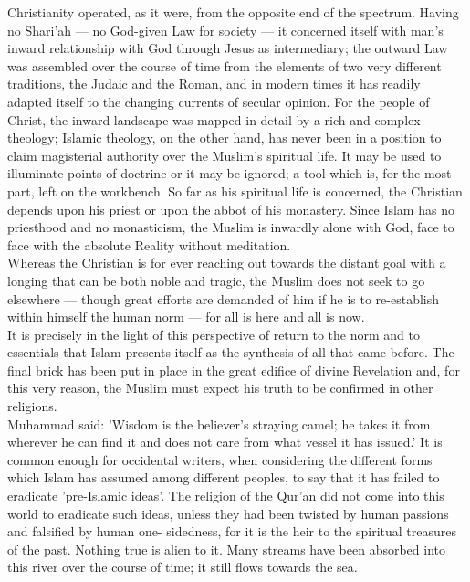 \documentclass[10pt, twoside]{book}
\begin{document}
Christianity operated, as it were, from the opposite end of the spectrum. Having no Shari'ah --- no 
God-given Law for society --- it concerned itself with man's inward relationship with God through Jesus 
as intermediary; the outward Law was assembled over the course of time from the elements of two very 
different traditions, the Judaic and the Roman, and in modern times it has readily adapted itself to 
the changing currents of secular opinion. For the people of Christ, the inward landscape was mapped 
in detail by a rich and complex theology; Islamic theology, on the other hand, has never been in a 
position to claim magisterial authority over the Muslim's spiritual life. It may be used to 
illuminate points of doctrine or it may be ignored; a tool which is, for the most part, left on the 
workbench. So far as his spiritual life is concerned, the Christian depends upon his priest or upon 
the abbot of his monastery. Since Islam has no priesthood and no monasticism, the Muslim is inwardly 
alone with God, face to face with the absolute Reality without meditation. \\

Whereas the Christian is for ever reaching out towards the distant goal with a longing that can be 
both noble and tragic, the Muslim does not seek to go elsewhere --- though great efforts are demanded 
of him if he is to re-establish within himself the human norm --- for all is here and all is now. \\

It is precisely in the light of this perspective of return to the norm and to essentials that Islam 
presents itself as the synthesis of all that came before. The final brick has been put in place in 
the great edifice of divine Revelation and, for this very reason, the Muslim must expect his truth to 
be confirmed in other religions. \\

Muhammad said: 'Wisdom is the believer's straying camel; he takes it from wherever he can find it and 
does not care from what vessel it has issued.' It is common enough for occidental writers, when 
considering the different forms which Islam has assumed among different peoples, to say that it has 
failed to eradicate 'pre\hyp{}Islamic ideas'. The religion of the Qur'an did not come into this world to 
eradicate such ideas, unless they had been twisted by human passions and falsified by human one\hyp{}
sidedness, for it is the heir to the spiritual treasures of the past. Nothing true is alien to it. 
Many streams have been absorbed into this river over the course of time; it still flows towards the 
sea. \\
\end{document}
